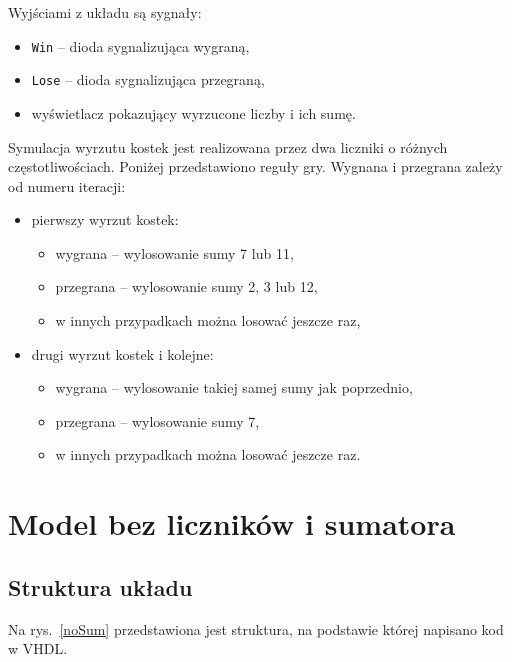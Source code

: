 \documentclass[a4paper,11pt,fleqn]{article}
\begin{document}
Wyjściami z układu są sygnały:
\begin{itemize}
\item \texttt{Win} -- dioda sygnalizująca wygraną,
\item \texttt{Lose} -- dioda sygnalizująca przegraną,
\item wyświetlacz pokazujący wyrzucone liczby i ich sumę.
\end{itemize}

Symulacja wyrzutu kostek jest realizowana przez dwa liczniki o różnych częstotliwościach. Poniżej przedstawiono reguły gry. Wygnana i przegrana zależy od numeru iteracji:
\begin{itemize}
\item pierwszy wyrzut kostek:
    \begin{itemize}
    \item wygrana -- wylosowanie sumy 7 lub 11, 
    \item przegrana -- wylosowanie sumy 2, 3 lub 12,
    \item w innych przypadkach można losować jeszcze raz,
    \end{itemize}
\item drugi wyrzut kostek i kolejne:
    \begin{itemize}
    \item wygrana -- wylosowanie takiej samej sumy jak poprzednio, 
    \item przegrana -- wylosowanie sumy 7,
    \item w innych przypadkach można losować jeszcze raz.
    \end{itemize}
\end{itemize}





\newpage
\section{Model bez liczników i sumatora}

\subsection{Struktura układu}

Na rys.~\ref{noSum} przedstawiona jest struktura, na podstawie której napisano kod w VHDL. 
\end{document}
